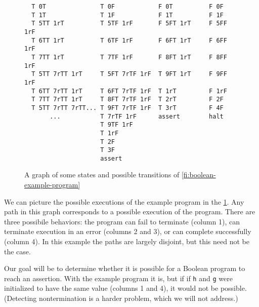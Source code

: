 \documentclass{article}
\newcommand{\Code}[1]{\texttt{#1}}
\begin{document}
\begin{figure}
\begin{verbatim}
  T 0T               T 0F            F 0T          F 0F
  T 1T               T 1F            F 1T          F 1F
  T 5TT 1rT          T 5TF 1rF       F 5FT 1rT     F 5FF 1rF
  T 6TT 1rT          T 6TF 1rF       F 6FT 1rT     F 6FF 1rF
  T 7TT 1rT          T 7TF 1rF       F 8FT 1rT     F 8FF 1rF
  T 5TT 7rTT 1rT     T 5FT 7rTF 1rF  T 9FT 1rT     F 9FF 1rF
  T 6TT 7rTT 1rT     T 6FT 7rTF 1rF  T 1rT         F 1rF
  T 7TT 7rTT 1rT     T 8FT 7rTF 1rF  T 2rT         F 2F
  T 5TT 7rTT 7rTT... T 9FT 7rTF 1rF  T 3rT         F 4F
       ...           T 7rTF 1rF      assert        halt
                     T 9TF 1rF
                     T 1rF
                     T 2F
                     T 3F
                     assert
\end{verbatim}
\caption{A graph of some states and possible transitions of
  \cref{fi:boolean-example-program}}
\label{fi:program-transition-graph}
\end{figure}

We can picture the possible executions of the example program in the
\cref{fi:program-transition-graph}.  Any path in this graph
corresponds to a possible execution of the program. There are three
possibile behaviors: the program can fail to terminate (column 1), can
terminate execution in an error (columns 2 and 3), or can complete
successfully (column 4). In this example the paths are largely
disjoint, but this need not be the case.

Our goal will be to determine whether it is possible for a Boolean
program to reach an assertion. With the example program it is, but if
if \Code{h} and \Code{g} were initialized to have the same value
(columns 1 and 4), it would not be possible. (Detecting nontermination
is a harder problem, which we will not address.)
\end{document}
